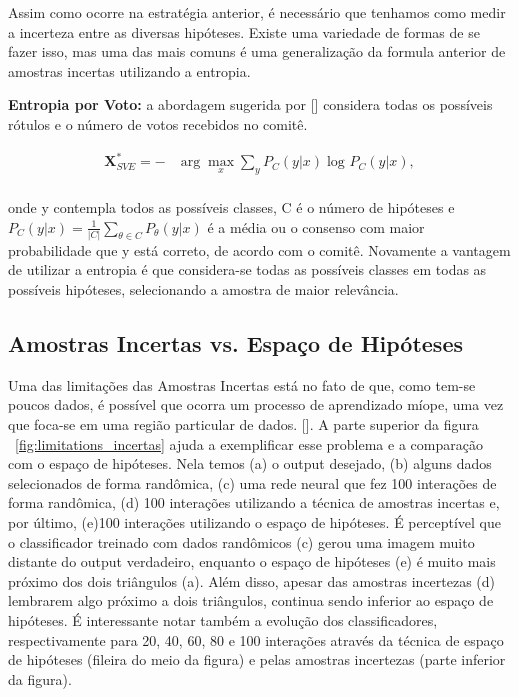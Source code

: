Assim como ocorre na estratégia anterior, é necessário que tenhamos como medir a incerteza entre as diversas hipóteses. Existe uma variedade de formas de se fazer isso, mas uma das mais comuns é uma generalização da formula anterior de amostras incertas utilizando a entropia.

\textbf{Entropia por Voto:} a abordagem sugerida por [\cite{dagan1995committee}] considera todas os possíveis rótulos e o número de votos recebidos no comitê. 

\begin{align*}
\textbf{X}^*_{SVE} = - &\arg\max_{x} \sum_{y} P_{C}  (y\lvert x) \log_{} P_{C}  (y\lvert x),\\
\end{align*}

onde y contempla todos as possíveis classes, C é o número de hipóteses e $P_{C}  (y\lvert x) = \frac{1}{|C|}  \sum_{\theta \in C} P_{\theta}  (y\lvert x)$ é a média ou o consenso com maior probabilidade que y está correto, de acordo com o comitê. Novamente a vantagem de utilizar a entropia é que considera-se todas as possíveis classes em todas as possíveis hipóteses, selecionando a amostra de maior relevância.


\subsection{Amostras Incertas vs. Espaço de Hipóteses} 
\label{sec:minimizing_expected}

Uma das limitações das Amostras Incertas está no fato de que, como tem-se poucos dados, é possível que ocorra um processo de aprendizado míope, uma vez que foca-se em uma região particular de dados.  [\cite{settles2014active}]. A parte superior da figura ~\ref{fig:limitations_incertas} ajuda a exemplificar esse problema e a comparação com o espaço de hipóteses. Nela temos (a) o output desejado, (b) alguns dados selecionados de forma randômica, (c) uma rede neural que fez 100 interações de forma randômica, (d) 100 interações utilizando a técnica de amostras incertas e, por último, (e)100 interações utilizando o espaço de hipóteses. É perceptível que o classificador treinado com dados randômicos (c) gerou uma imagem muito distante do output verdadeiro, enquanto o espaço de hipóteses (e) é muito mais próximo dos dois triângulos (a). Além disso, apesar das amostras incertezas (d) lembrarem algo próximo a dois triângulos, continua sendo inferior ao espaço de hipóteses. É interessante notar também a evolução dos classificadores, respectivamente para 20, 40, 60, 80 e 100 interações através da técnica de espaço de hipóteses (fileira do meio da figura) e pelas amostras incertezas (parte inferior da figura).

